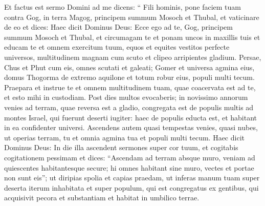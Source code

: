 \begin{biblechapter}
\begin{biblechapter}
\begin{biblechapter}
\begin{biblechapter}
\begin{biblechapter}
\begin{biblechapter}
\begin{biblechapter}
\begin{biblechapter}
\begin{biblechapter}
\begin{biblechapter}
\begin{biblechapter}
\begin{biblechapter}
\begin{biblechapter}
\begin{biblechapter}
\begin{biblechapter}
\begin{biblechapter}
\begin{biblechapter}
\begin{biblechapter}
\begin{biblechapter}
\begin{biblechapter}
\begin{biblechapter}
\begin{biblechapter}
\begin{biblechapter}
\begin{biblechapter}
\begin{biblechapter}
\begin{biblechapter}
\begin{biblechapter}
\begin{biblechapter}
\begin{biblechapter}
\begin{biblechapter}
\begin{biblechapter}
\begin{biblechapter}
\begin{biblechapter}
\begin{biblechapter}
\begin{biblechapter}
\begin{biblechapter}
\begin{biblechapter}
\begin{biblechapter}
\verse Et factus est sermo Domini ad me dicens: 
\verse “ Fili hominis, pone faciem tuam contra Gog, in terra Magog, principem summum Mosoch et Thubal, et vaticinare de eo 
\verse et dices: Haec dicit Dominus Deus: Ecce ego ad te, Gog, principem summum Mosoch et Thubal, 
\verse et circumagam te et ponam uncos in maxillis tuis et educam te et omnem exercitum tuum, equos et equites vestitos perfecte universos, multitudinem magnam cum scuto et clipeo arripientes gladium. 
 \verse Persae, Chus et Phut cum eis, omnes scutati et galeati; 
\verse Gomer et universa agmina eius, domus Thogorma de extremo aquilone et totum robur eius, populi multi tecum. 
\verse Praepara et instrue te et omnem multitudinem tuam, quae coacervata est ad te, et esto mihi in custodiam. 
\verse Post dies multos evocaberis; in novissimo annorum venies ad terram, quae reversa est a gladio, congregata est de populis multis ad montes Israel, qui fuerunt deserti iugiter: haec de populis educta est, et habitant in ea confidenter universi. 
\verse Ascendens autem quasi tempestas venies, quasi nubes, ut operias terram, tu et omnia agmina tua et populi multi tecum.
 \verse Haec dicit Dominus Deus: In die illa ascendent sermones super cor tuum, et cogitabis cogitationem pessimam 
\verse et dices: “Ascendam ad terram absque muro, veniam ad quiescentes habitantesque secure; hi omnes habitant sine muro, vectes et portae non sunt eis”; 
\verse ut diripias spolia et capias praedam, ut inferas manum tuam super deserta iterum inhabitata et super populum, qui est congregatus ex gentibus, qui acquisivit pecora et substantiam et habitat in umbilico terrae. 

\end{biblechapter}
\end{biblechapter}
\end{biblechapter}
\end{biblechapter}
\end{biblechapter}
\end{biblechapter}
\end{biblechapter}
\end{biblechapter}
\end{biblechapter}
\end{biblechapter}
\end{biblechapter}
\end{biblechapter}
\end{biblechapter}
\end{biblechapter}
\end{biblechapter}
\end{biblechapter}
\end{biblechapter}
\end{biblechapter}
\end{biblechapter}
\end{biblechapter}
\end{biblechapter}
\end{biblechapter}
\end{biblechapter}
\end{biblechapter}
\end{biblechapter}
\end{biblechapter}
\end{biblechapter}
\end{biblechapter}
\end{biblechapter}
\end{biblechapter}
\end{biblechapter}
\end{biblechapter}
\end{biblechapter}
\end{biblechapter}
\end{biblechapter}
\end{biblechapter}
\end{biblechapter}
\end{biblechapter}
